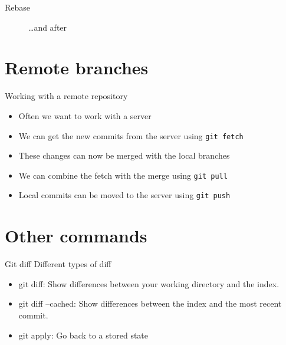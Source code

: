 \documentclass[12pt]{beamer}
\begin{document}
\begin{frame}{Rebase}
\begin{figure}
	\centering
	\caption{\ldots and after}
	
\end{figure}
\end{frame}


\section{Remote branches}

\begin{frame}[fragile]{Working with a remote repository}
\begin{itemize}
\item Often we want to work with a server
\item We can get the new commits from the server using \texttt{git fetch}
\item These changes can now be merged with the local branches
\item We can combine the fetch with the merge using \texttt{git pull}
\item Local commits can be moved to the server using \texttt{git push}
\end{itemize}
\end{frame}


\section{Other commands}

\begin{frame}{Git diff}
	Different types of diff
	\begin{itemize}
    \item git diff: Show differences between your working directory and the index.
    \item git diff –cached: Show differences between the index and the most recent commit.
    \item git apply: Go back to a stored state
	\end{itemize}	
\end{frame}	
\end{document}
